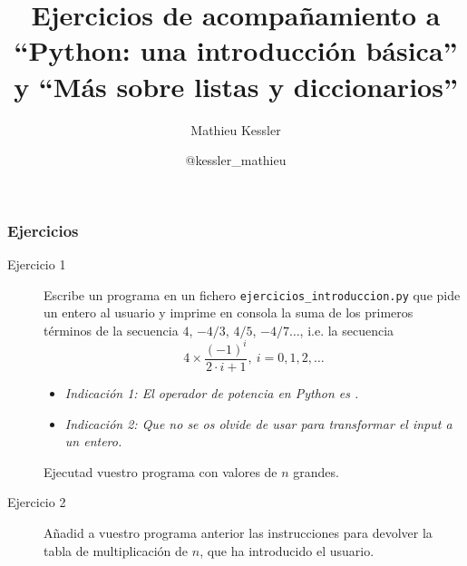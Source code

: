 \documentclass[handout,9pt]{beamer}
\begin{document}
\title{Ejercicios de acompañamiento a ``Python: una introducción
  básica'' y ``Más sobre listas y diccionarios'' }

\author[Mathieu Kessler]{Mathieu Kessler}
\date{@kessler\_mathieu}{}%

\begin{frame}
  \titlepage
\end{frame}

\begin{frame}[fragile]
  \frametitle{Ejercicios}
  \begin{description}
    \item[Ejercicio 1] Escribe un programa en un fichero {\tt ejercicios\_introduccion.py} que
      pide un entero  al usuario y imprime en consola la suma
      de los primeros   términos de la secuencia $4$, $-4/3$, $4/5$, $-4/7
      \ldots$, i.e. la secuencia
      $$ 4\times \frac{(-1)^{i}}{2\cdot i + 1},\ i = 0, 1, 2, \ldots$$
      \begin{itemize}
      \item \textit{Indicación 1: El operador de potencia en Python es
          \pyv{**}.}
      \item \textit{Indicación 2: Que no se os olvide de usar
           para transformar el input a un entero.}
      \end{itemize}
      Ejecutad vuestro programa con valores de $n$ grandes.
    \item[Ejercicio 2] Añadid a vuestro programa anterior
            las instrucciones para devolver la tabla de multiplicación
      de $n$, que ha introducido el usuario.

    \end{description}  
  \end{frame}
\end{document}
